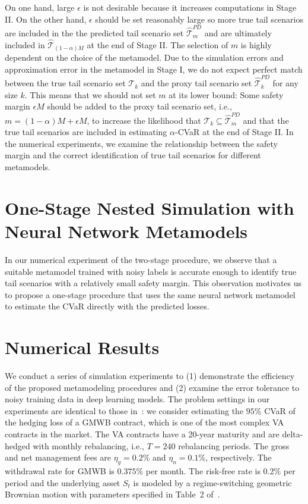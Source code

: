 \documentclass[]{article}
\newcommand{\tail}{\mathcal{T}}
\begin{document}
On one hand, large $\epsilon$ is not desirable because it increases computations in Stage II.
On the other hand, $\epsilon$ should be set reasonably large so more true tail scenarios are included in the the predicted tail scenario set $\widehat{\tail}_{m}^{PD}$ and are ultimately included in $\widehat{\tail}_{(1-\alpha )M}$ at the end of Stage II.
The selection of $m$ is highly dependent on the choice of the metamodel.
Due to the simulation errors and approximation error in the metamodel in Stage I, we do not expect perfect match between the true tail scenario set $\tail_{k}$ and the proxy tail scenario set $\widehat{\tail}_{k}^{PD}$ for any size $k$.
This means that we should not set $m$ at its lower bound: Some safety margin $\epsilon M$ should be added to the proxy tail scenario set, i.e., $m = (1-\alpha )M + \epsilon M$, to increase the likelihood that $\tail_{k} \subseteq \widehat{\tail}_{m}^{PD}$ and that the true tail scenarios are included in estimating $\alpha$-CVaR at the end of Stage II.
In the numerical experiments, we examine the relationship between the safety margin and the correct identification of true tail scenarios for different metamodels.

\section{One-Stage Nested Simulation with Neural Network Metamodels} \label{sec:metamodel1Stage}

In our numerical experiment of the two-stage procedure, we observe that a suitable metamodel trained with noisy labels is accurate enough to identify true tail scenarios with a relatively small safety margin.
This observation motivates us to propose a one-stage procedure that uses the same neural network metamodel to estimate the CVaR directly with the predicted losses. 

\section{Numerical Results} \label{sec:numerical}

We conduct a series of simulation experiments to (1) demonstrate the efficiency of the proposed metamodeling procedures and (2) examine the error tolerance to noisy training data in deep learning models.
The problem settings in our experiments are identical to those in~\cite{dang2020efficient}:
we consider estimating the $95\%$ CVaR of the hedging loss of a GMWB contract, which is one of the most complex VA contracts in the market.
The VA contracts have a 20-year maturity and are delta-hedged with monthly rebalancing, i.e., $T=240$ rebalancing periods.
The gross and net management fees are $\eta_g = 0.2\%$ and $\eta_n=0.1\%$, respectively.
The withdrawal rate for GMWB is $0.375\%$ per month.
The risk-free rate is 0.2\% per period and the underlying asset $S_t$ is modeled by a regime-switching geometric Brownian motion with parameters specified in Table~2 of~\cite{dang2020efficient}.
\end{document}
